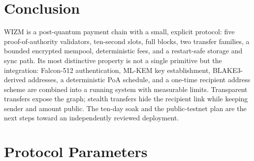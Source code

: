 \documentclass[11pt,a4paper]{article}
\begin{document}
\section{Conclusion}

WIZM is a post-quantum payment chain with a small, explicit protocol: five
proof-of-authority validators, ten-second slots, full blocks, two transfer
families, a bounded encrypted mempool, deterministic fees, and a
restart-safe storage and sync path. Its most distinctive property is not a
single primitive but the integration: Falcon-512 authentication, ML-KEM key
establishment, BLAKE3-derived addresses, a deterministic PoA schedule, and a
one-time recipient address scheme are combined into a running system with
measurable limits. Transparent transfers expose the graph; stealth transfers
hide the recipient link while keeping sender and amount public. The ten-day
soak and the public-testnet plan are the next steps toward an independently
reviewed deployment.

\appendix

\section{Protocol Parameters}
\label{app:params}
\end{document}
